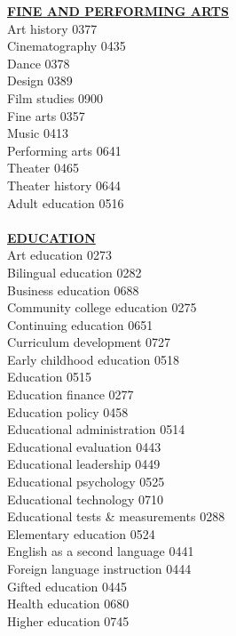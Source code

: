 \documentclass[9pt,twoside]{article}
\newcommand{\categoryheading}[1]{{\fontsize{8}{11}\selectfont \textbf{\uline{#1}}}}
\begin{document}
\begin{multicols}{3}
\categoryheading{FINE AND PERFORMING ARTS} \\
Art history \hfill 0377 \\
Cinematography \hfill 0435 \\
Dance \hfill 0378 \\
Design \hfill 0389 \\
Film studies \hfill 0900 \\
Fine arts \hfill 0357 \\
Music \hfill 0413 \\
Performing arts \hfill 0641 \\
Theater \hfill 0465 \\
Theater history \hfill 0644 \\
Adult education \hfill 0516 \\
\columnbreak \\
\categoryheading{EDUCATION} \\
Art education \hfill 0273 \\
Bilingual education \hfill 0282 \\
Business education \hfill 0688 \\
Community college education \hfill 0275 \\
Continuing education \hfill 0651 \\
Curriculum development \hfill 0727 \\
Early childhood education \hfill 0518 \\
Education \hfill 0515 \\
Education finance \hfill 0277 \\
Education policy \hfill 0458 \\
Educational administration \hfill 0514 \\
Educational evaluation \hfill 0443 \\
Educational leadership \hfill 0449 \\
Educational psychology \hfill 0525 \\
Educational technology \hfill 0710 \\
Educational tests \& measurements \hfill 0288 \\
Elementary education \hfill 0524 \\
English as a second language \hfill 0441 \\
Foreign language instruction \hfill 0444 \\
Gifted education \hfill 0445 \\
Health education \hfill 0680 \\
Higher education \hfill 0745 \\

\end{multicols}
\end{document}
